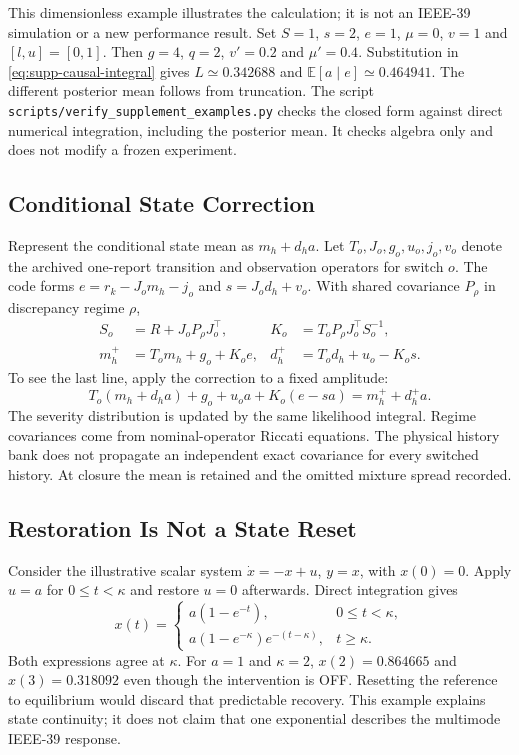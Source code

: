 This dimensionless example illustrates the calculation; it is not an
IEEE-39 simulation or a new performance result. Set
$S=1$, $s=2$, $e=1$, $\mu=0$, $v=1$ and $[l,u]=[0,1]$.
Then $g=4$, $q=2$, $v'=0.2$ and $\mu'=0.4$. Substitution in
\eqref{eq:supp-causal-integral} gives
$L\simeq0.342688$ and
$\mathbb E[a\mid e]\simeq0.464941$.
The different posterior mean follows from truncation.
The script \nolinkurl{scripts/verify_supplement_examples.py} checks the
closed form against direct numerical integration, including the posterior
mean. It checks algebra only and does not modify a frozen experiment.

\subsection{Conditional State Correction}
\label{sec:supp-causal-state}

Represent the conditional state mean as $m_h+d_h a$. Let
$T_o,J_o,g_o,u_o,j_o,v_o$ denote the archived one-report transition and
observation operators for switch $o$. The code forms
$e=r_k-J_o m_h-j_o$ and $s=J_o d_h+v_o$. With shared covariance
$P_\rho$ in discrepancy regime $\rho$,
\begin{align}
 S_o&=R+J_oP_\rho J_o^\top,&
 K_o&=T_oP_\rho J_o^\top S_o^{-1},\nonumber\\
 m_h^+&=T_o m_h+g_o+K_o e,&
 d_h^+&=T_o d_h+u_o-K_o s.
 \label{eq:implemented-conditional-correction}
\end{align}
To see the last line, apply the correction to a fixed amplitude:
\[
 T_o(m_h+d_h a)+g_o+u_o a+K_o(e-sa)
     =m_h^++d_h^+a.
\]
The severity distribution is updated by the same likelihood integral.
Regime covariances come from nominal-operator Riccati equations. The physical history bank does
not propagate an independent exact covariance for every switched history.
At closure the mean is retained and the omitted mixture spread recorded.

\subsection{Restoration Is Not a State Reset}

Consider the illustrative scalar system
$\dot x=-x+u$, $y=x$, with $x(0)=0$. Apply $u=a$ for
$0\le t<\kappa$ and restore $u=0$ afterwards. Direct integration gives
\begin{equation}
 x(t)=\begin{cases}
 a(1-e^{-t}),&0\le t<\kappa,\\
 a(1-e^{-\kappa})e^{-(t-\kappa)},&t\ge\kappa.
 \end{cases}
\end{equation}
Both expressions agree at $\kappa$. For $a=1$ and $\kappa=2$,
$x(2)=0.864665$ and $x(3)=0.318092$ even though the intervention is OFF.
Resetting the reference to equilibrium would discard that predictable
recovery. This example explains state continuity; it does not claim that
one exponential describes the multimode IEEE-39 response.

